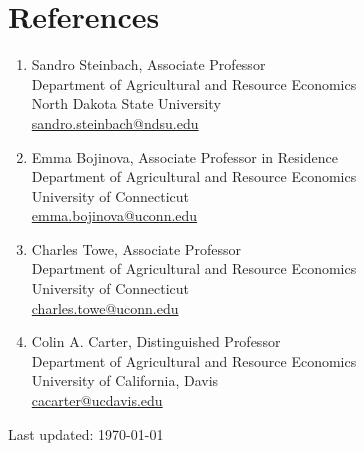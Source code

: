 \documentclass[10.5pt,letterpaper]{article}
\begin{document}
	\newpage
\section*{\textbf{References}}

\begin{multicols}{2}
	\begin{enumerate}[leftmargin=0in]
		
		\item[] Sandro Steinbach, Associate Professor \\
		Department of Agricultural and Resource Economics \\
		North Dakota State University \\
		\href{mailto:sandro.steinbach@ndsu.edu}{sandro.steinbach@ndsu.edu}
		
		\item[] Emma Bojinova, Associate Professor in Residence \\
		Department of Agricultural and Resource Economics \\
		University of Connecticut \\
		\href{mailto:emma.bojinova@uconn.edu}{emma.bojinova@uconn.edu}
		
		\item[] Charles Towe, Associate Professor \\
		Department of Agricultural and Resource Economics \\
		University of Connecticut \\
		\href{mailto:charles.towe@uconn.edu}{charles.towe@uconn.edu}
		
		\item[] Colin A. Carter, Distinguished Professor \\
		Department of Agricultural and Resource Economics \\
		University of California, Davis \\
		\href{mailto:cacarter@ucdavis.edu}{cacarter@ucdavis.edu}
		
	\end{enumerate}
\end{multicols}

	
	\vfill
	\begin{center}
		\begin{footnotesize}
			\raggedleft Last updated: \today
		\end{footnotesize}
	\end{center}
	
\end{document}
